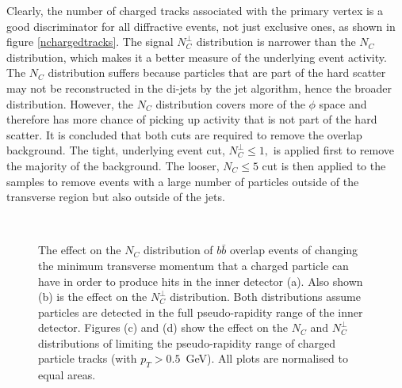 Clearly, the number of charged tracks associated with the primary vertex is a good discriminator for all diffractive events, not just exclusive ones, as shown in figure \ref{nchargedtracks}. 
The signal $N_C^{\perp}$ distribution is narrower than the $N_C$ distribution, which makes it a better measure of the underlying event activity. The $N_C$ distribution suffers because particles that are part of the hard scatter may not be reconstructed in the di-jets by the jet algorithm, hence the broader distribution. However, the $N_C$ distribution covers more of the $\phi$ space and therefore has more chance of picking up activity that is not part of the hard scatter. It is concluded that both cuts are required to remove the overlap background. The tight, underlying event cut, $N_C^{\perp}\leq1,$ is applied first to remove the majority of the background. The looser, $N_C\leq 5$ cut is then applied to the samples to remove events with a large number of particles outside of the transverse region but also outside of the jets.


\begin{figure}
\centering
\mbox{
	\quad
	}
\mbox{
	\quad
	}
	
\caption[The dependence of the $N_C$ and $N_C^{\perp}$ distributions on the minimum transverse momentum and pseudo-rapidity of the charged particles]{The effect on the $N_C$ distribution of $b\bar{b}$ overlap events of changing the minimum transverse momentum that a charged particle can have in order to produce hits in the inner detector (a). Also shown (b) is the effect on the $N_C^{\perp}$ distribution. Both distributions assume particles are detected in the full pseudo-rapidity range of the inner detector. Figures (c) and (d) show the effect on the $N_C$ and $N_C^{\perp}$ distributions of limiting the pseudo-rapidity range of charged particle tracks (with $p_T>0.5$~GeV). All plots are normalised to equal areas. \label{nchargeddependence}}
\end{figure}


